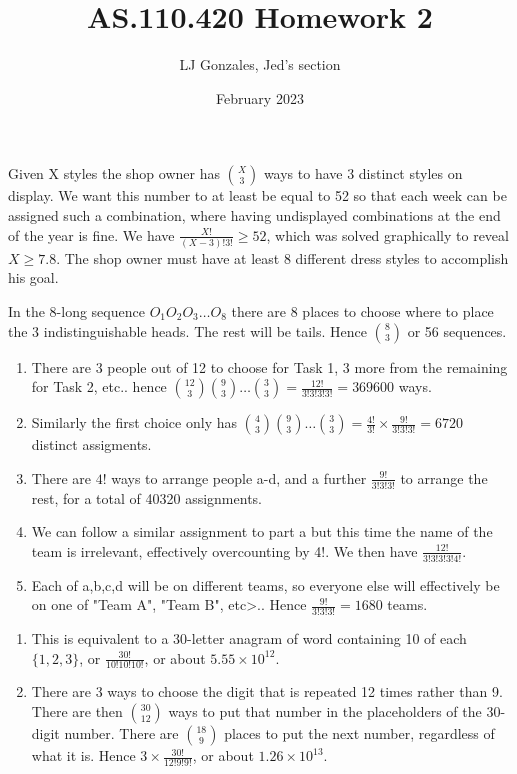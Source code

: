 \documentclass{article}
\title{AS.110.420 Homework 2}
\author{LJ Gonzales, Jed's section}
\date{February 2023}
\begin{document}
\maketitle

\begin{prob}
Given X styles the shop owner has ${X \choose 3}$ ways to have 3 distinct styles on display. We want this number to at least be equal to 52 so that each week can be assigned such a combination, where having undisplayed combinations at the end of the year is fine. We have $\frac{X!}{(X-3)!3!}\geq52$, which was solved graphically to reveal $X\geq7.8$. The shop owner must have at least 8 different dress styles to accomplish his goal.
\end{prob}

\begin{prob}
    In the 8-long sequence $O_1O_2O_3\dots O_8$ there are 8 places to choose where to place the 3 indistinguishable heads. The rest will be tails. Hence ${8 \choose 3}$ or 56 sequences.
\end{prob}

\begin{prob}
    \begin{enumerate}
        \item There are 3 people out of 12 to choose for Task 1, 3 more from the remaining for Task 2, etc.. hence ${12 \choose 3}{9 \choose 3}\dots {3\choose3}=\frac{12!}{3!3!3!3!}=369600$ ways.
        \item Similarly the first choice only has ${4\choose3}{9\choose3}\dots{3\choose3}=\frac{4!}{3!}\times\frac{9!}{3!3!3!}=6720$ distinct assigments.
        \item There are $4!$ ways to arrange people a-d, and a further $\frac{9!}{3!3!3!}$ to arrange the rest, for a total of 40320 assignments.
        \item We can follow a similar assignment to part a but this time the name of the team is irrelevant, effectively overcounting by 4!. We then have $\frac{12!}{3!3!3!3!4!}$.
        \item Each of a,b,c,d will be on different teams, so everyone else will effectively be on one of "Team A", "Team B", etc>.. Hence $\frac{9!}{3!3!3!}=1680$ teams.
    \end{enumerate}
\end{prob}

\begin{prob}
    \begin{enumerate}
        \item This is equivalent to a 30-letter anagram of  word containing 10 of each $\{1,2,3\}$, or $\frac{30!}{10!10!10!}$, or about $5.55\times10^{12}$.
        \item There are 3 ways to choose the digit that is repeated 12 times rather than 9. There are then ${30 \choose 12}$ ways to put that number in the placeholders of the 30-digit number. There are ${18 \choose 9}$ places to put the next number, regardless of what it is. Hence $3\times\frac{30!}{12!9!9!}$, or about $1.26\times10^{13}$.
    \end{enumerate}
\end{prob}
\end{document}
